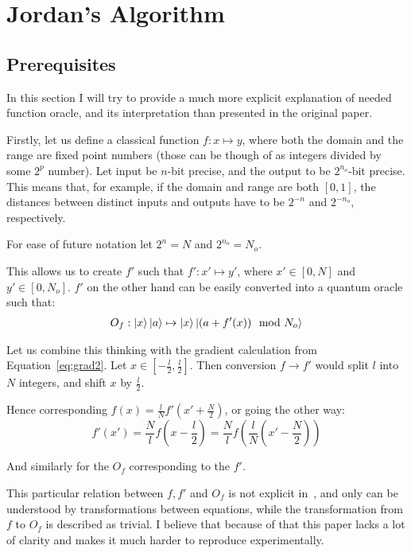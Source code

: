 \documentclass{article}
\begin{document}
\section{Jordan's Algorithm}
\label{sec:jord-alg}
\subsection{Prerequisites}
\label{sec:jord-preq}
In this section I will try to provide a much more explicit explanation of needed function oracle,
and its interpretation than presented in the original paper.

Firstly, let us define a classical function $f: x \mapsto y$, where both the domain and the range are fixed point numbers (those can be though of as integers divided by some $2^p$ number).
Let input be $n$-bit precise, and the output to be $2^{n_o}$-bit precise. This means that, for example, if the domain and range are both $[0, 1]$, the distances between distinct inputs and outputs have to be $2^{-n}$ and $2^{-n_o}$, respectively.

For ease of future notation let $2^n = N$ and $2^{n_o} = N_o$.

This allows us to create $f'$ such that $f': x' \mapsto y'$, where $x' \in [0, N]$ and $y' \in [0, N_o]$.
$f'$ on the other hand can be easily converted into a quantum oracle such that:
\begin{align}
    O_f: \ket{x}\ket{a} \mapsto \ket{x}\ket{(a + f'(x)) \mod N_o}
\end{align}

Let us combine this thinking with the gradient calculation from Equation~\ref{eq:grad2}. Let $x \in [-\frac{l}{2}, \frac{l}{2}]$.
Then conversion $f \rightarrow f'$ would split $l$ into $N$ integers, and shift $x$ by $\frac{l}{2}$.

Hence corresponding $f(x) = \frac{l}{N}f'(x' + \frac{N}{2})$, or going the other way:
\begin{equation}
    \label{eq:func-conversion}
    f'(x') = \frac{N}{l}f(x - \frac{l}{2}) = \frac{N}{l}f(\frac{l}{N}(x' - \frac{N}{2}))
\end{equation}

And similarly for the $O_f$ corresponding to the $f'$.

This particular relation between $f, f'$ and $O_f$ is not explicit in~\cite{Jordan_2005},
and only can be understood by transformations between equations, while the transformation from $f$ to $O_f$ is described as trivial.
I believe that because of that this paper lacks a lot of clarity and makes it much harder to reproduce experimentally.
\end{document}
